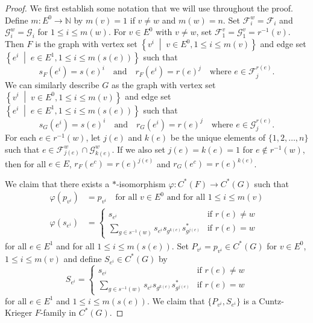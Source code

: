 \documentclass[12pt]{amsbook}%
\newcommand{\setof}[2]{\left\{ #1 \;\middle|\; #2 \right\}}
\renewcommand{\phi}{\varphi}
\theoremstyle{defin}
\theoremstyle{remark}
\numberwithin{equation}{chapter}
\numberwithin{theor}{section}
\newcommand{\NN}{\mathbb{N}}
\begin{document}
\begin{proof}
We first establish some notation that we will use throughout the proof.  Define $m \colon E^0 \to \NN$ by $m(v) = 1$ if $v \neq w$ and $m(w) = n$.  Set $\mathcal{F}_i^w = \mathcal{F}_i$ and $\mathcal{G}_i^w = \mathcal{G}_i$ for $1 \leq i \leq m(w)$.  For $v \in E^0$ with $v \neq w$, set $\mathcal{F}^v_1 = \mathcal{G}_1^v = r^{-1} (v)$.  Then $F$ is the graph with vertex set $\setof{ v^i }{ v \in E^0 , 1 \leq i \leq m(v) }$ and edge set $\setof{ e^i }{ e \in E^1 , 1 \leq i \leq m ( s(e) ) }$ such that 
\[
s_F (e^i) = s(e)^i \quad \text{and} \quad r_F (e^i ) = r(e)^j \quad \text{where } e \in \mathcal{F}_j^{r(e)}.
\]
We can similarly describe $G$ as the graph with vertex set $\setof{ v^i }{ v \in E^0 , 1 \leq i \leq m(v) }$ and edge set $\setof{ e^i }{ e \in E^1 , 1 \leq i \leq m ( s(e) ) }$ such that 
\[
s_G (e^i) = s(e)^i \quad \text{and} \quad r_G(e^i ) = r(e)^j \quad \text{where } e \in \mathcal{G}_j^{r(e)}.
\]
For each $e \in r^{-1}(w)$, let $j(e)$ and $k(e)$ be the unique elements of $\{1, 2, \ldots, n \}$ such that $e \in \mathcal{F}^w_{j(e)} \cap \mathcal{G}_{k(e)}^w$.  If we also set $j(e)= k(e)=1$ for $e \notin r^{-1}(w)$, then for all $e \in E$, $r_{F}(e^c) = r(e)^{j(e)}$ and $r_{G}(e^c)= r(e)^{k(e)}$.  


We claim that there exists a $*$-isomorphism $\phi \colon C^*(F) \to C^*(G)$ such that
\begin{align*}
\phi ( p_{v^{i}} ) &= p_{v^i} \quad \text{for all $v \in E^0$ and for all $1 \leq i \leq m(v)$}\\
\phi ( s_{e^{i}}) &= 
\begin{cases}
s_{e^i} &\text{if } r(e) \neq w \\
\displaystyle\sum_{ g \in s^{-1} (w) } s_{e^i} s_{g^{k(e)}} s_{ g^{j(e)}}^* &\text{if } r(e)=w
\end{cases}
\end{align*}
for all $e \in E^1$ and for all $1 \leq i \leq m ( s (e) )$.  Set $P_{v^i} = p_{v^i} \in C^*(G)$ for $v \in E^0$, $1 \leq i \leq m(v)$ and define $S_{e^i} \in C^*(G)$ by
\[
S_{e^i} = 
\begin{cases}
s_{e^i} &\text{if } r(e) \neq w \\
\displaystyle \sum_{ g \in s^{-1} (w) } s_{e^i} s_{g^{k(e)}} s_{ g^{j(e)}}^* &\text{if } r(e)= w
\end{cases}
\]
for all $e \in E^1$ and $1 \leq i \leq m ( s(e) )$.  We claim that $\{ P_{v^i} , S_{e^i} \}$ is a Cuntz-Krieger $F$-family in $C^*(G)$.  


\end{proof}
\end{document}
